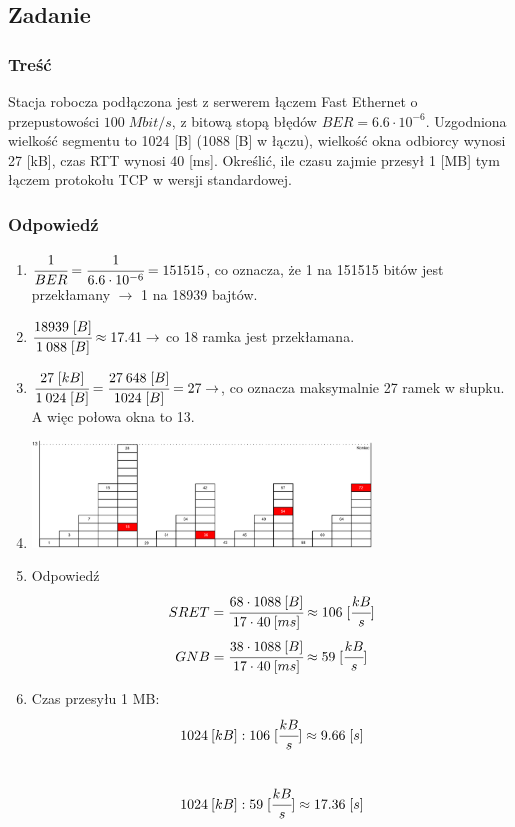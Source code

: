 \documentclass[a4paper,twoside]{article}
\begin{document}
\subsection{Zadanie}
\subsubsection{Treść}
Stacja robocza podłączona jest z serwerem łączem Fast Ethernet o przepustowości $100\;Mbit/s $, z bitową stopą błędów $ BER=6.6\cdot 10^{-6} $. Uzgodniona wielkość segmentu to 1024 [B] (1088 [B] w łączu), wielkość okna odbiorcy wynosi 27 [kB], czas RTT wynosi 40 [ms]. Określić, ile czasu zajmie przesył 1 [MB] tym łączem protokołu TCP w wersji standardowej.
\subsubsection{Odpowiedź}
\begin{enumerate}
	\item $ \cfrac{1}{BER}=\cfrac{1}{6.6\cdot 10^{-6}}=151515$, co oznacza, że 1 na 151515 bitów jest przekłamany $ \rightarrow $ 1 na 18939 bajtów.
	\item $ \cfrac{18939\;[B]}{1\:088\;[B]}\approx17.41 \rightarrow $ co 18 ramka jest przekłamana.
	\item $ \cfrac{27\;[kB]}{1\:024\;[B]}=\cfrac{27\:648\;[B]}{1024\;[B]}=27 \rightarrow $, co oznacza maksymalnie 27 ramek w słupku. A więc połowa okna to 13.
	\item
	\begin{center}
		\includegraphics[width=9.0cm]{./images/zadanie14.pdf}
	\end{center}
	\item Odpowiedź
	$$ SRET=\cfrac{68\cdot1088\:[B]}{17\cdot40\:[ms]}\approx106\;[\cfrac{kB}{s}]$$
	$$\\\\ GNB=\cfrac{38\cdot1088\:[B]}{17\cdot40\:[ms]}\approx59\;[\cfrac{kB}{s}]$$
	\item Czas przesyłu 1 MB:\\
	$$ 1024\:[kB] : 106\;[\cfrac{kB}{s}]\approx9.66\;[s] $$\\
	$$ 1024\:[kB] : 59\;[\cfrac{kB}{s}]\approx17.36\;[s] $$
\end{enumerate}
\newpage
\end{document}

